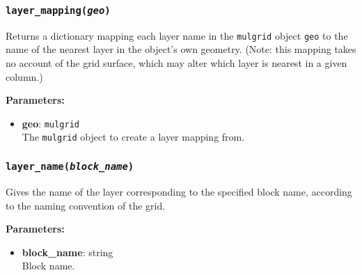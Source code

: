 \subsubsection{\texttt{layer\_mapping(\emph{geo})}}
\label{sec:layer_mapping}

Returns a dictionary mapping each layer name in the \texttt{mulgrid} object \texttt{geo} to the name of the nearest layer in the object's own geometry.  (Note: this mapping takes no account of the grid surface, which may alter which layer is nearest in a given column.)

\textbf{Parameters:}
\begin{itemize}
\item \textbf{geo}: \texttt{mulgrid}\\
  The \texttt{mulgrid} object to create a layer mapping from.
\end{itemize}

\subsubsection{\texttt{layer\_name(\emph{block\_name})}}
\label{sec:layer_name}

Gives the name of the layer corresponding to the specified block name, according to the naming convention of the grid.

\textbf{Parameters:}
\begin{itemize}
\item \textbf{block\_name}: string\\
  Block name.
\end{itemize}

